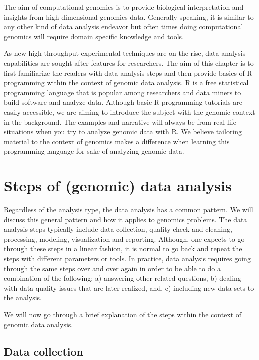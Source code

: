 \documentclass[12pt,]{krantz}
\begin{document}
The aim of computational genomics is to provide biological interpretation and insights from high
dimensional genomics data. Generally speaking, it is similar to any other kind
of data analysis endeavor but often times doing computational genomics will require domain specific knowledge and tools.

As new high-throughput experimental techniques are on the rise, data analysis
capabilities are sought-after features for researchers. The aim of this chapter is to first familiarize the readers with data analysis steps and then provide basics of R programming within the context of genomic data analysis. R is a free statistical programming language that is popular among researchers and data miners to build software and analyze data. Although
basic R programming tutorials are easily accessible, we are aiming to introduce
the subject with the genomic context in the background. The examples and
narrative will always be from real-life situations when you try to analyze
genomic data with R. We believe tailoring material to the context of genomics
makes a difference when learning this programming language for sake of analyzing
genomic data.

\hypertarget{steps-of-genomic-data-analysis}{%
\section{Steps of (genomic) data analysis}\label{steps-of-genomic-data-analysis}}

Regardless of the analysis type, the data analysis has a common pattern. We will
discuss this general pattern and how it applies to genomics problems. The data analysis steps typically include data collection, quality check and cleaning, processing, modeling, visualization and reporting. Although, one expects to go through these steps in a linear fashion, it is normal to go back and repeat the steps with different parameters or tools. In practice, data analysis requires going through the same steps over and over again in order to be able to do a combination of the following: a) answering other related questions, b) dealing with data quality issues that are later realized, and, c) including new data sets to the analysis.

We will now go through a brief explanation of the steps within the context of genomic data analysis.

\hypertarget{data-collection}{%
\subsection{Data collection}\label{data-collection}}
\end{document}
